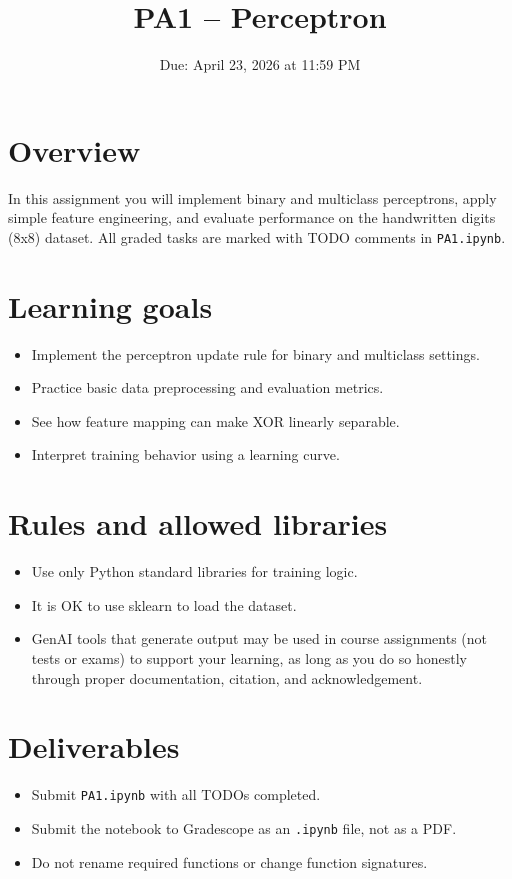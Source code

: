 \documentclass[11pt]{article}
\title{PA1 -- Perceptron}
\date{Due: April 23, 2026 at 11:59 PM}
\begin{document}
\maketitle

\section*{Overview}
In this assignment you will implement binary and multiclass perceptrons, apply
simple feature engineering, and evaluate performance on the handwritten digits
(8x8) dataset. All graded tasks are marked with TODO comments in
\texttt{PA1.ipynb}.

\section*{Learning goals}
\begin{itemize}[leftmargin=1.25em]
  \item Implement the perceptron update rule for binary and multiclass settings.
  \item Practice basic data preprocessing and evaluation metrics.
  \item See how feature mapping can make XOR linearly separable.
  \item Interpret training behavior using a learning curve.
\end{itemize}

\section*{Rules and allowed libraries}
\begin{itemize}[leftmargin=1.25em]
  \item Use only Python standard libraries for training logic.
  \item It is OK to use sklearn to load the dataset.
  \item GenAI tools that generate output may be used in course assignments (not tests or exams) to support your learning, as long as you do so honestly through proper documentation, citation, and acknowledgement.
\end{itemize}

\section*{Deliverables}
\begin{itemize}[leftmargin=1.25em]
  \item Submit \texttt{PA1.ipynb} with all TODOs completed.
  \item Submit the notebook to Gradescope as an \texttt{.ipynb} file, not as a PDF.
  \item Do not rename required functions or change function signatures.
\end{itemize}
\end{document}
